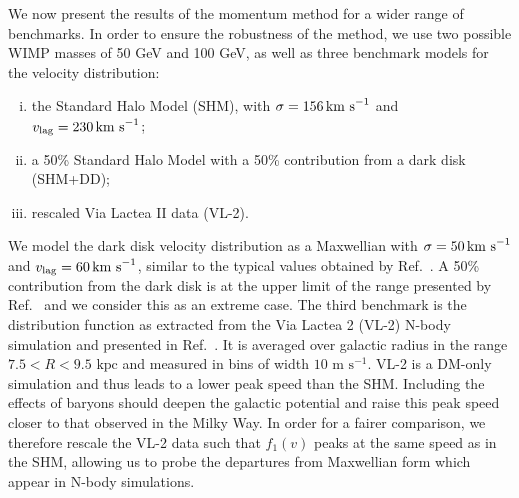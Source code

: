 We now present the results of the momentum method for a wider range of benchmarks. In order to ensure the robustness of the method, we use two possible WIMP masses of 50 GeV and 100 GeV, as well as three benchmark models for the velocity distribution:

\begin{enumerate}[(i)]
\item the Standard Halo Model (SHM), with \(\sigma = 156 \,\textrm{km s}^{-1}\) and \(v_\textrm{lag} = 230 \,\textrm{km s}^{-1}\);
\item a 50\% Standard Halo Model with a 50\% contribution from a dark disk (SHM+DD);
\item rescaled Via Lactea II data (VL-2).
\end{enumerate}

We model the dark disk velocity distribution as a Maxwellian with \(\sigma = 50 \,\textrm{km s}^{-1}\) and \(v_\textrm{lag} = 60 \,\textrm{km s}^{-1}\), similar to the typical values obtained by Ref.\ \cite{Purcell:2009}. A 50\% contribution from the dark disk is at the upper limit of the range presented by Ref.\ \cite{Read:2010} and we consider this as an extreme case. The third benchmark is the distribution function as extracted from the Via Lactea 2 (VL-2) N-body simulation \cite{Diemand:2008} and presented in Ref.\ \cite{Kuhlen:2010}. It is averaged over galactic radius in the range \(7.5 < R < 9.5 \textrm{ kpc}\) and measured in bins of width \(10 \textrm{ m s}^{-1}\). VL-2 is a DM-only simulation and thus leads to a lower peak speed than the SHM. Including the effects of baryons should deepen the galactic potential and raise this peak speed closer to that observed in the Milky Way. In order for a fairer comparison, we therefore rescale the VL-2 data such that \(f_1(v)\) peaks at the same speed as in the SHM, allowing us to probe the departures from Maxwellian form which appear in N-body simulations.


